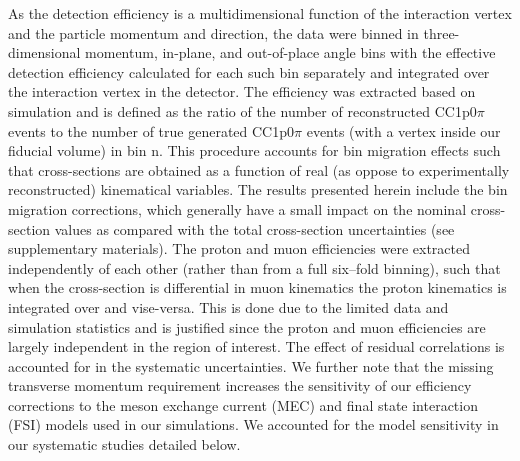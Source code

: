 \documentclass[aps,prl,showpacs,twocolumn,superscriptaddress,letterpaper,longbibliography]{revtex4-1}
\begin{document}
As the detection efficiency is a multidimensional function of the interaction vertex and the particle momentum and direction,
the data were binned in three-dimensional momentum, in-plane, and out-of-place angle bins 
with the effective detection efficiency calculated for each such bin separately and integrated over the interaction vertex in the detector.
The efficiency was extracted based on simulation and is defined as the ratio of the number of reconstructed CC1p0$\pi$ events to the 
number of true generated CC1p0$\pi$ events (with a vertex inside our fiducial volume) in bin n.  
This procedure accounts for bin migration effects such that cross-sections are obtained as a function of real (as oppose to experimentally reconstructed) kinematical variables. 
The results presented herein include the bin migration corrections, which generally have a small impact on the nominal cross-section values as compared with the total cross-section uncertainties (see supplementary materials).
The proton and muon efficiencies were extracted independently of each other (rather than from a full six--fold binning),
such that when the cross-section is differential in muon kinematics the proton kinematics is integrated over and vise-versa.
This is done due to the limited data and simulation statistics and is justified since the proton and muon efficiencies are largely independent in the region of interest. The effect of residual correlations is accounted for in the systematic uncertainties.
We further note that the missing transverse momentum requirement increases the sensitivity of our efficiency corrections to the meson exchange current (MEC) and final state interaction (FSI) models used in our simulations. We accounted for the model sensitivity in our systematic studies detailed below.
\end{document}
